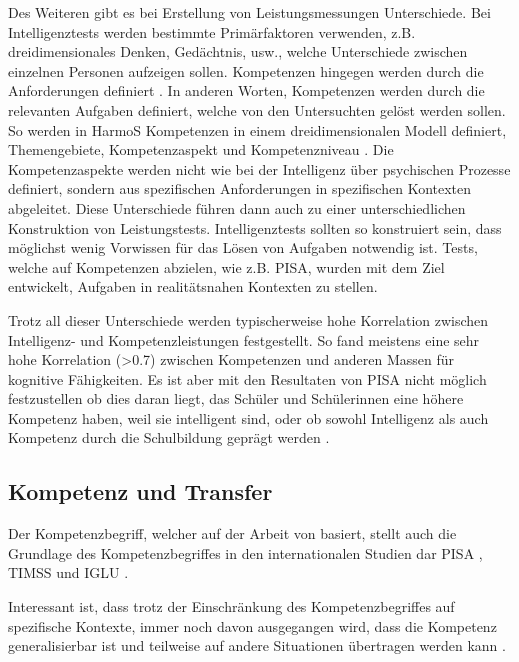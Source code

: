 Des Weiteren gibt es bei Erstellung von Leistungsmessungen Unterschiede. Bei Intelligenztests werden bestimmte Primärfaktoren verwenden, z.B. dreidimensionales Denken, Gedächtnis, usw., welche Unterschiede zwischen einzelnen Personen aufzeigen sollen. Kompetenzen hingegen werden durch die Anforderungen definiert \citep{Rychen}. In anderen Worten, Kompetenzen werden durch die relevanten Aufgaben definiert, welche von den Untersuchten gelöst werden sollen. So werden in HarmoS Kompetenzen in einem dreidimensionalen Modell definiert, Themengebiete, Kompetenzaspekt und Kompetenzniveau \citep{KonsotriumHarmoSNaturwissenschaften+2010}. Die Kompetenzaspekte werden nicht wie bei der Intelligenz über psychischen Prozesse definiert, sondern aus spezifischen Anforderungen in spezifischen Kontexten abgeleitet. Diese Unterschiede führen dann auch zu einer unterschiedlichen Konstruktion von Leistungstests. Intelligenztests sollten so konstruiert sein, dass möglichst wenig Vorwissen für das Lösen von Aufgaben notwendig ist. Tests, welche auf Kompetenzen abzielen, wie z.B. PISA, wurden mit dem Ziel entwickelt, Aufgaben in realitätsnahen  Kontexten zu stellen. 

Trotz all dieser Unterschiede werden typischerweise hohe Korrelation zwischen Intelligenz- und Kompetenzleistungen festgestellt. So fand \citet{Rindermann2006} meistens eine sehr hohe Korrelation (>0.7) zwischen Kompetenzen und anderen Massen für kognitive Fähigkeiten. Es ist aber mit den Resultaten von PISA nicht möglich festzustellen ob dies daran liegt, das Schüler und Schülerinnen eine höhere Kompetenz haben, weil sie intelligent sind, oder ob sowohl Intelligenz als auch Kompetenz durch die Schulbildung geprägt werden \citep{Hartig2006}.



\subsection{Kompetenz und Transfer}
Der Kompetenzbegriff, welcher auf der Arbeit von \citet{Klieme2004, Weinert2001b} basiert, stellt auch die Grundlage des Kompetenzbegriffes in den internationalen Studien dar PISA \citep{PISA-KonsortiumDeuschland2004}, TIMSS \citep{Martin2003} und IGLU \citep{Bos2003}.

Interessant ist, dass trotz der Einschränkung des Kompetenzbegriffes auf spezifische Kontexte, immer noch davon ausgegangen wird, dass die Kompetenz generalisierbar ist und teilweise auf andere Situationen übertragen werden kann \citet{Hartig2006}.